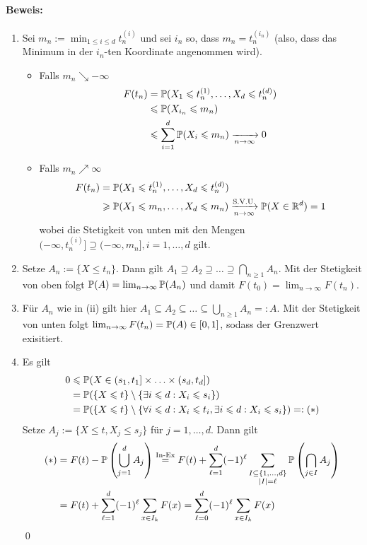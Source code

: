\documentclass[11pt]{report}
\begin{document}
\paragraph{Beweis:}
\begin{enumerate}[label=(\roman*)]
    \item Sei $m_n:=\displaystyle\min_{1\leq i\leq d}t_n^{(i)}$ und sei $i_n$ so, dass $m_n=t_n^{(i_n)}$ (also, dass das Minimum in der $i_n$-ten Koordinate angenommen wird). 
    \begin{itemize}
        \item Falls $m_n\searrow-\infty$
        \begin{align*}
            F(t_n)&=\Pp(X_1\leq t_n^{(1)},\hdots,X_d\leq t_n^{(d)})\\
            &\leq\Pp(X_{i_n}\leq m_n)\\
            &\leq\sum_{i=1}^d\Pp(X_i\leq m_n)\nto{}{n\to\infty}0
        \end{align*}
        \item Falls $m_n\nearrow\infty$
        \begin{align*}
            F(t_n)&=\Pp(X_1\leq t_n^{(1)},\hdots,X_d\leq t_n^{(d)})\\
            &\geq\Pp(X_1\leq m_n,\hdots,X_d\leq m_n)\nto{\text{S.V.U.}}{n\to\infty}\Pp(X\in\R^d)=1
        \end{align*}
        wobei die Stetigkeit von unten mit den Mengen $(-\infty,t_n^{(i)}]\supseteq(-\infty,m_n],i=1,\hdots,d$ gilt. 
    \end{itemize}
    \item Setze $A_n:=\{X\leq t_n\}$. Dann gilt $A_1\supseteq A_2\supseteq\hdots\supseteq\bigcap_{n\geq1}A_n$. Mit der Stetigkeit von oben folgt $\mathbb{P}(A)=\lim_{n\to\infty}\mathbb{P}(A_n)$ und damit $F(t_0)=\lim_{n\to\infty}F(t_n)$.
    \item F\"ur $A_n$ wie in (ii) gilt hier $A_1\subseteq A_2\subseteq\hdots\subseteq\bigcup_{n\geq1}A_n=:A$. Mit der Stetigkeit von unten folgt $\lim_{n\to\infty}F(t_n)=\mathbb{P}(A)\in[0,1]$, sodass der Grenzwert exisitiert. 
    \item Es gilt
    \begin{align*}
        0&\leqslant\mathbb{P}(X\in(s_1,t_1]\times\hdots\times(s_d,t_d])\\
        &=\mathbb{P}(\{X\leqslant t\}\setminus\{\exists i\leqslant d: X_i\leqslant s_i\})\\
        &=\mathbb{P}(\{X\leqslant t\}\setminus\{\forall i\leqslant d:X_i\leqslant t_i,\exists i\leqslant d: X_i\leqslant s_i\})=:(*)
    \end{align*}
    Setze $A_j:=\{X\leq t,X_j\leq s_j\}$ f\"ur $j=1,\hdots,d$. Dann gilt
    \begin{align*}
        (*)&=F(t)-\mathbb{P}\left(\bigcup_{j=1}^d A_j\right)\overset{\text{In-Ex}}{=}F(t)+\sum_{\ell=1}^d(-1)^\ell\sum_{\substack{I\subseteq\{1,\hdots,d\}\\|I|=\ell}}\mathbb{P}\left(\bigcap_{j\in I}A_j\right)\\
        &=F(t)+\sum_{\ell=1}^d(-1)^\ell\sum_{x\in I_k}F(x)=\sum_{\ell=0}^d(-1)^\ell\sum_{x\in I_k}F(x)
    \end{align*}
    \qed
\end{enumerate}
\end{document}
